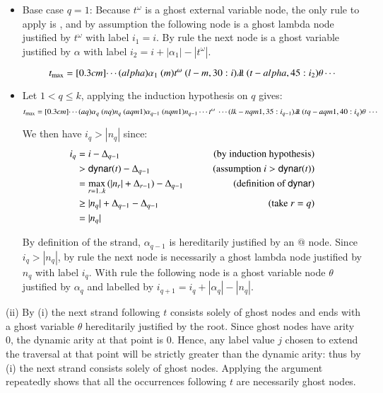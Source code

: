 \documentclass{elsarticle}
\theoremstyle{plain}
\theoremstyle{definition}
\newcommand{\ghostlmd}{{\lambda\!\!\lambda}}
\newcommand{\ghostvar}{\theta}
\newcommand{\essential}{{\sf ess}}
\newcommand\dynar{\textsf{dynar}} %
\begin{document}
\begin{itemize}
\item Base case $q=1$: Because $t^\omega$ is a ghost external variable node, the only rule to apply is \rulenamet{IVar_\essential}, and by assumption the following node is a ghost lambda node justified by $t^\omega$ with label $i_1 = i$. By rule \rulenamet{Lam^\ghostvar} the next node is a ghost variable justified by $\alpha$ with label $i_2 = i + |\alpha_1| - |t^\omega|$.

$$ t_{\max} = \Pstr[0.3cm]{ \cdots (alpha){\alpha_1}\ (m){t^\omega}\ (l-m,30:i){\ghostlmd}\ (t-alpha,45:i_2){\ghostvar} \cdots} $$

\item Let $1<q\leq k$, applying the induction hypothesis on $q$ gives:
$$
t_{\max} = \Pstr[0.3cm]{
   \cdots
  (aq){\alpha_q}\
  (nq){n_q} \
  (aqm1){\alpha_{q-1}}\
  (nqm1){n_{q-1}}
 \cdots
 t^\omega\ \cdots
  (lk-nqm1,35:{i_{q-1}})\ghostlmd\
  (tq-aqm1,40:{i_{q}})\ghostvar\
   \cdots
}
$$

We then have $i_{q} > |n_q|$ since:
\begin{align*}
i_{q} &= i - \Delta_{q-1}
&\qquad\hbox{(by induction hypothesis)}\\
    &> \dynar(t) - \Delta_{q-1}
&\qquad\hbox{(assumption $i> \dynar(t)$)} \\
        &= \max_{r=1..k} \left( |n_r| + \Delta_{r-1} \right)
        - \Delta_{q-1}
& \qquad\hbox{(definition of $\dynar$)} \\
    &\geq |n_q| + \Delta_{q-1} - \Delta_{q-1}
&\qquad\hbox{(take $r=q$)} \\
    &= |n_q|
\end{align*}


By definition of the strand, $\alpha_{q-1}$ is hereditarily justified by an $@$ node.
Since $i_q > |n_q|$, by rule  the next node is necessarily a ghost lambda node justified by $n_q$ with label $i_q$. With rule \rulenamet{Lam^\ghostvar} the following node is a ghost variable node $\ghostvar$ justified by $\alpha_q$ and labelled by $i_{q+1} = i_q + |\alpha_{q}| -|n_{q}|$.
\end{itemize}

(ii) By (i) the next strand following $t$ consists solely of ghost nodes and ends with a ghost variable $\ghostvar$ hereditarily justified by the root. Since ghost nodes have arity $0$, the dynamic arity at that point is $0$. Hence, any label value $j$ chosen to extend the traversal at that point will be strictly greater than the dynamic arity: thus by (i) the next strand consists solely of ghost nodes.
Applying the argument repeatedly shows that all the occurrences following $t$ are necessarily ghost nodes.
\end{document}
